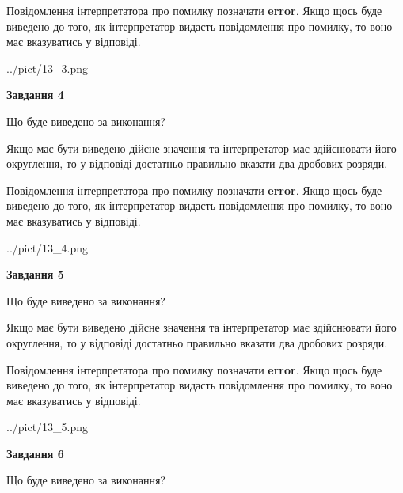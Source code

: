 \documentclass[12pt, ukrainian]{article}
\begin{document}
{\begin {Large}
Повідомлення інтерпретатора про помилку позначати \textbf{error}.
Якщо щось буде виведено до того, як інтерпретатор видасть повідомлення про помилку, 
то воно має вказуватись у відповіді. \par

\begin{center}
	{../pict/13_3.png}
\end{center}
\newpage

{\begin {center}\textbf{Завдання 4}\end {center}}\par
Що буде виведено за виконання? \par

Якщо має бути виведено дійсне значення та інтерпретатор має здійснювати його округлення, 
то у відповіді достатньо правильно вказати два дробових розряди.

Повідомлення інтерпретатора про помилку позначати \textbf{error}.
Якщо щось буде виведено до того, як інтерпретатор видасть повідомлення про помилку, 
то воно має вказуватись у відповіді. \par

\begin{center}
	{../pict/13_4.png}
\end{center}
\newpage

{\begin {center}\textbf{Завдання 5}\end {center}}\par
Що буде виведено за виконання? \par

Якщо має бути виведено дійсне значення та інтерпретатор має здійснювати його округлення, 
то у відповіді достатньо правильно вказати два дробових розряди.

Повідомлення інтерпретатора про помилку позначати \textbf{error}.
Якщо щось буде виведено до того, як інтерпретатор видасть повідомлення про помилку, 
то воно має вказуватись у відповіді. \par

\begin{center}
	{../pict/13_5.png}
\end{center}
\newpage

{\begin {center}\textbf{Завдання 6}\end {center}}\par
Що буде виведено за виконання? \par


\end{Large}}
\end{document}
